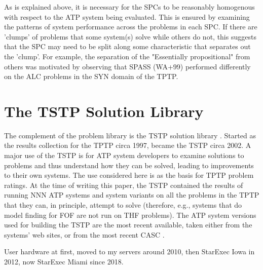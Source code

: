 \documentclass[runningheads]{llncs}
\begin{document}
As is explained above, it is necessary for the SPCs to be reasonably homogenous with respect to 
the ATP system being evaluated. This is ensured by examining the patterns of system performance 
across the problems in each SPC. 
If there are 'clumps' of problems that some system(s) solve while others do not, this suggests 
that the SPC may need to be split along some characteristic that separates out the 'clump'. 
For example, the separation of the "Essentially propositional" from others was motivated by 
observing that SPASS (WA+99) performed differently on the ALC problems in the SYN domain of the 
TPTP.

\section{The TSTP Solution Library}
\label{TSTP}

The complement of the problem library is the TSTP solution library \cite{Sut10}.
Started as the results collection for the TPTP circa 1997, became the TSTP circa 2002.
A major use of the TSTP is for ATP system developers to examine solutions to problems and thus 
understand how they can be solved, leading to improvements to their own systems. 
The use considered here is as the basis for TPTP problem ratings.
At the time of writing this paper, the TSTP contained the results of running NNN ATP systems and 
system variants on all the problems in the TPTP that they can, in principle, attempt to solve 
(therefore, e.g., systems that do model finding for FOF are not run on THF problems).
The ATP system versions used for building the TSTP are the most recent available, taken either 
from the systems’ web sites, or from the most recent CASC \cite{}.

User hardware at first, moved to my servers around 2010, then StarExec Iowa \cite{} in 2012,
now StarExec Miami since 2018.
\end{document}
